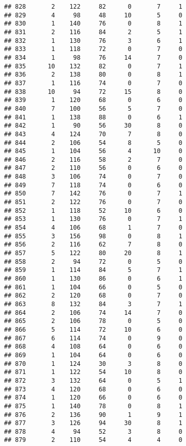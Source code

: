 \documentclass[
]{article}
\begin{document}
\begin{verbatim}
## 828       2    122     82      0       7     1
## 829       4     98     48     10       5     0
## 830       1    140     76      0       8     1
## 831       2    116     84      2       5     1
## 832       1    130     76      3       6     1
## 833       1    118     72      0       7     0
## 834       1     98     76     14       7     0
## 835      10    132     82      0       7     1
## 836       2    138     80      0       8     1
## 837       1    116     74      0       7     0
## 838      10     94     72     15       8     0
## 839       1    120     68      0       6     0
## 840       7    100     56      5       7     0
## 841       1    138     88      0       6     1
## 842       1     90     56     30       8     0
## 843       4    124     70      7       8     0
## 844       2    106     54      8       5     0
## 845       1    104     56      4      10     0
## 846       2    116     58      2       7     0
## 847       2    110     56      0       6     0
## 848       3    106     74      0       7     0
## 849       7    118     74      0       6     0
## 850       7    142     76      0       7     1
## 851       2    122     76      0       7     0
## 852       1    118     52     10       6     0
## 853       1    130     76      0       7     1
## 854       4    106     68      1       7     0
## 855       3    156     98      0       8     1
## 856       2    116     62      7       8     0
## 857       5    122     80     20       8     1
## 858       2     94     72      0       5     0
## 859       1    114     84      5       7     1
## 860       1    130     86      0       6     1
## 861       1    104     66      0       5     0
## 862       2    120     68      0       7     0
## 863       8    132     84      3       7     1
## 864       2    106     74     14       7     0
## 865       2    106     78      0       5     0
## 866       5    114     72     10       6     0
## 867       6    114     74      0       9     0
## 868       4    108     64      0       6     0
## 869       1    104     64      0       6     0
## 870       1    124     30      3       8     0
## 871       1    122     54     10       8     0
## 872       3    132     64      0       5     1
## 873       4    120     68      0       6     0
## 874       1    120     66      0       6     0
## 875       1    140     78      0       8     1
## 876       2    136     90      1       9     1
## 877       3    126     94     30       8     1
## 878       4     94     52      3       8     0
## 879       2    110     54      4       4     0

\end{verbatim}
\end{document}
